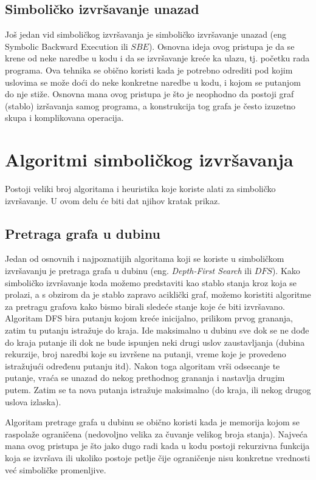 \documentclass[12pt,oneside]{memoir}
\begin{document}
\subsection{Simboličko izvršavanje unazad} 
Još jedan vid simboličkog izvršavanja je simboličko izvršavanje unazad (eng Symbolic Backward Execution ili $SBE$). Osnovna ideja ovog pristupa je da se krene od neke naredbe u kodu i da se izvršavanje kreće ka ulazu, tj. početku rada programa. Ova tehnika se obično koristi kada je potrebno odrediti pod kojim uslovima se može doći do neke konkretne naredbe u kodu, i kojom se putanjom do nje stiže. Osnovna mana ovog pristupa je što je neophodno da postoji graf (stablo) izršavanja samog programa, a konstrukcija tog grafa je često izuzetno skupa i komplikovana operacija.

\section{Algoritmi simboličkog izvršavanja}

Postoji veliki broj algoritama i heuristika koje koriste alati za simboličko izvršavanje. U ovom delu će biti dat njihov kratak prikaz.

\bigbreak

\subsection{Pretraga grafa u dubinu} \label{DFS}
Jedan od osnovnih i najpoznatijih algoritama koji se koriste u simboličkom izvršavanju je pretraga grafa u dubinu (eng. \textit{Depth-First Search} ili $DFS$). Kako simboličko izvršavanje koda možemo predstaviti kao stablo stanja kroz koja se prolazi, a s obzirom da je stablo zapravo aciklički graf, možemo koristiti algoritme za pretragu grafova kako bismo birali sledeće stanje koje će biti izvršavano. Algoritam DFS bira putanju kojom kreće inicijalno, prilikom prvog grananja, zatim tu putanju istražuje do kraja. Ide maksimalno u dubinu sve dok se ne dođe do kraja putanje ili dok ne bude ispunjen neki drugi uslov zaustavljanja (dubina rekurzije, broj naredbi koje su izvršene na putanji, vreme koje je provedeno istražujući određenu putanju itd). Nakon toga algoritam vrši odsecanje te putanje, vraća se unazad do nekog prethodnog grananja i nastavlja drugim putem. Zatim se ta nova putanja istražuje maksimalno (do kraja, ili nekog drugog uslova izlaska). 

Algoritam pretrage grafa u dubinu se obično koristi kada je memorija kojom se raspolaže ograničena (nedovoljno velika za čuvanje velikog broja stanja). Najveća mana ovog pristupa je što jako dugo radi kada u kodu postoji rekurzivna funkcija koja se izvršava ili ukoliko postoje petlje čije ograničenje nisu konkretne vrednosti već simboličke promenljive. 
\end{document}

